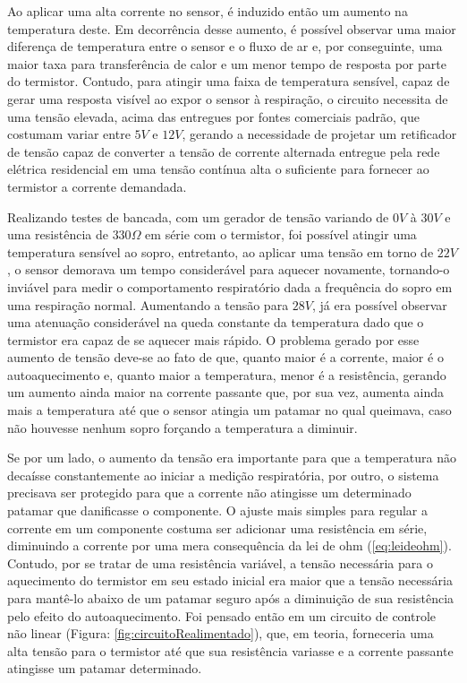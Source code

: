  
 
Ao aplicar uma alta corrente no sensor, é induzido então um aumento na temperatura deste. Em decorrência desse aumento, é possível observar uma maior diferença de temperatura entre o sensor e o fluxo de ar e, por conseguinte, uma maior taxa para transferência de calor e um menor tempo de resposta por parte do termistor. Contudo, para atingir uma faixa de temperatura sensível, capaz de gerar uma resposta visível ao expor o sensor à respiração, o circuito necessita de uma tensão elevada, acima das entregues por fontes comerciais padrão, que costumam variar entre $5V$ e $12V$, gerando a necessidade de projetar um retificador de tensão capaz de converter a tensão de corrente alternada entregue pela rede elétrica residencial em uma tensão contínua alta o suficiente para fornecer ao termistor a corrente demandada.
 
Realizando testes de bancada, com um gerador de tensão variando de $0V$ à $30V$ e uma resistência de $330\Omega$ em série com o termistor, foi possível atingir uma temperatura sensível ao sopro, entretanto, ao aplicar uma tensão em torno de $22V$, o sensor demorava um tempo considerável para aquecer novamente, tornando-o inviável para medir o comportamento respiratório dada a frequência do sopro em uma respiração normal. Aumentando a tensão para $28V$, já era possível observar uma atenuação considerável na queda constante da temperatura dado que o termistor era capaz de se aquecer mais rápido. O problema gerado por esse aumento de tensão deve-se ao fato de que, quanto maior é a corrente, maior é o autoaquecimento e, quanto maior a temperatura, menor é a resistência, gerando um aumento ainda maior na corrente passante que, por sua vez, aumenta ainda mais a temperatura até que o sensor atingia um patamar no qual queimava, caso não houvesse nenhum sopro forçando a temperatura a diminuir. 
 
Se por um lado, o aumento da tensão era importante para que a temperatura não decaísse constantemente ao iniciar a medição respiratória, por outro, o sistema precisava ser protegido para que a corrente não atingisse um determinado patamar que danificasse o componente. O ajuste mais simples para regular a corrente em um componente costuma ser adicionar uma resistência em série, diminuindo a corrente por uma mera consequência da lei de ohm (\ref{eq:leideohm}). Contudo, por se tratar de uma resistência variável, a tensão necessária para o aquecimento do termistor em seu estado inicial era maior que a tensão necessária para mantê-lo abaixo de um patamar seguro após a diminuição de sua resistência pelo efeito do autoaquecimento. Foi pensado então em um circuito de controle não linear (Figura: \ref{fig:circuitoRealimentado}), que, em teoria, forneceria uma alta tensão para o termistor até que sua resistência variasse e a corrente passante atingisse um patamar determinado. 
  
